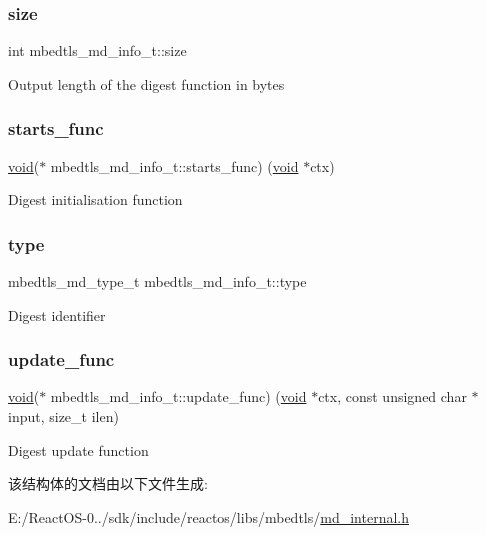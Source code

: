 \subsubsection{\texorpdfstring{size}{size}}
{\footnotesize\ttfamily int mbedtls\+\_\+md\+\_\+info\+\_\+t\+::size}

Output length of the digest function in bytes \mbox{\label{structmbedtls__md__info__t_a63f493cb3f21ba384544cc8094b98695}} 
\subsubsection{\texorpdfstring{starts\+\_\+func}{starts\_func}}
{\footnotesize\ttfamily \hyperlink{interfacevoid}{void}($\ast$ mbedtls\+\_\+md\+\_\+info\+\_\+t\+::starts\+\_\+func) (\hyperlink{interfacevoid}{void} $\ast$ctx)}

Digest initialisation function \mbox{\label{structmbedtls__md__info__t_ae27d588a1b1a7c4f96384fc5705f5c3d}} 
\subsubsection{\texorpdfstring{type}{type}}
{\footnotesize\ttfamily mbedtls\+\_\+md\+\_\+type\+\_\+t mbedtls\+\_\+md\+\_\+info\+\_\+t\+::type}

Digest identifier \mbox{\label{structmbedtls__md__info__t_ababa3afde569e7f97f86639bad8b91ef}} 
\subsubsection{\texorpdfstring{update\+\_\+func}{update\_func}}
{\footnotesize\ttfamily \hyperlink{interfacevoid}{void}($\ast$ mbedtls\+\_\+md\+\_\+info\+\_\+t\+::update\+\_\+func) (\hyperlink{interfacevoid}{void} $\ast$ctx, const unsigned char $\ast$input, size\+\_\+t ilen)}

Digest update function 

该结构体的文档由以下文件生成\+:\begin{DoxyCompactItemize}
\item 
E\+:/\+React\+O\+S-\/0../sdk/include/reactos/libs/mbedtls/\hyperlink{md__internal_8h}{md\+\_\+internal.\+h}\end{DoxyCompactItemize}
